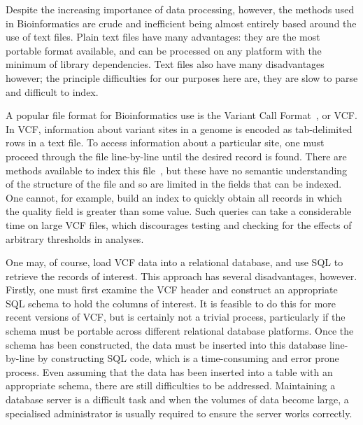 \documentclass{bioinfo}
\begin{document}
Despite the increasing importance of data processing, however, the methods 
used in Bioinformatics are crude and inefficient being almost entirely 
based around the use of text files. Plain text files have many advantages:
they are the most portable format available, and can be processed on 
any platform with the minimum of library dependencies. Text files also 
have many disadvantages however; the principle difficulties for our 
purposes here are, they are slow to parse and difficult to index.

A popular file format for Bioinformatics use is the Variant Call Format~\citep{da+11},
or VCF. In VCF,  information about variant sites in a genome is encoded 
as tab-delimited rows in a text file. To access information about a 
particular site, one must proceed through the file line-by-line until the 
desired record is found. There are methods available to index this 
file~\citep{li11}, but these have no semantic 
understanding of the structure of the file and so are limited in the 
fields that can be indexed. One cannot, for example, build an index 
to quickly obtain all records in which the quality field is greater
than some value. Such queries can take a considerable time on large VCF 
files, which discourages testing and checking for the effects of 
arbitrary thresholds in analyses.

One may, of course, load VCF data into a relational database, and 
use SQL to retrieve the records of interest. This approach has several 
disadvantages, however. Firstly, one must first examine the VCF 
header and construct an appropriate SQL schema to hold the columns 
of interest. It is feasible to do this for more recent versions of VCF, 
but is certainly not a trivial process, particularly if the schema 
must be portable across different relational database platforms.
Once the schema has been constructed, the data must be inserted into 
this database line-by-line by constructing SQL code, which is a 
time-consuming and error prone process. Even assuming that the data 
has been inserted into a table with an appropriate schema, there 
are still difficulties to be addressed. Maintaining a database 
server is a difficult task and when the volumes of data become
large, a specialised administrator is usually required to 
ensure the server works correctly.
\end{document}

